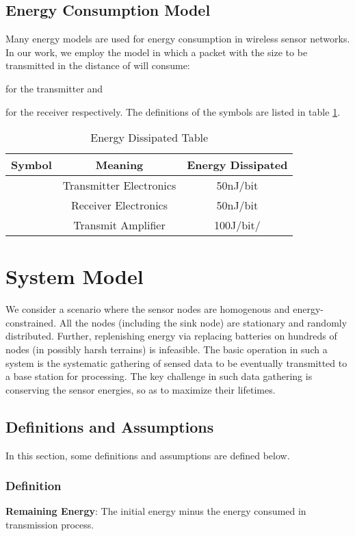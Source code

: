 \documentclass{elsarticle}
\begin{document}
\subsection{Energy Consumption Model} \label{energyConsumptionModel}
Many energy models \cite{label-15} are used for energy consumption in wireless sensor networks. In our work, we employ the model in which a packet with the size  to be transmitted in the distance of  will consume:


for the transmitter and

for the receiver respectively. The definitions of the symbols are listed in table \ref{tabel1}.

\begin{table}
\centering
\caption{Energy Dissipated Table} \label{tabel1}
\begin{tabular}{c|c|c}
\hline
\textbf{Symbol} & \textbf{Meaning} & \textbf{Energy Dissipated} \\
\hline
 & Transmitter Electronics & 50nJ/bit \\
 & Receiver Electronics & 50nJ/bit \\
 & Transmit Amplifier & 100J/bit/{} \\
\hline
\end{tabular}
\end{table}

\section{System Model} \label{SystemModel}
We consider a scenario where the sensor nodes are homogenous and energy-constrained. All the nodes (including the sink node) are stationary and randomly distributed. Further, replenishing energy via replacing batteries on hundreds of nodes (in possibly harsh terrains) is infeasible. The basic operation in such a system is the systematic gathering of sensed data to be eventually transmitted to a base station for processing. The key challenge in such data gathering is conserving the sensor energies, so as to maximize their lifetimes.


\subsection{Definitions and Assumptions}
In this section, some definitions and assumptions are defined below.
\subsubsection{Definition}
\textbf{Remaining Energy}: The initial energy minus the energy consumed in transmission process.
\end{document}
